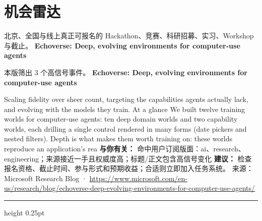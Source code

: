\documentclass[10.5pt]{ctexart}
\begin{document}
\section*{机会雷达}
{\color{ormuted} 北京、全国与线上真正可报名的 Hackathon、竞赛、科研招募、实习、Workshop 与截止。}
\vspace{2mm}
{\LARGE\bfseries Echoverse: Deep, evolving environments for computer-use agents}\par
\vspace{1mm}
{\color{ormuted} 本版筛出 3 个高信号事件。}
\vspace{3mm}
{\Large\bfseries Echoverse: Deep, evolving environments for computer-use agents}\par
Scaling fidelity over sheer count, targeting the capabilities agents actually lack, and evolving with the models they train. At a glance We built twelve training worlds for computer-use agents: ten deep domain worlds and two capability worlds, each drilling a single control rendered in many forms (date pickers and nested filters). Depth is what makes them worth training on: these worlds reproduce an application’s rea
\textbf{与你有关：} 命中用户订阅版面：ai、research、engineering；来源接近一手且权威度高；标题/正文包含高信号变化
\textbf{建议：} 检查报名资格、截止时间、参与形式和预期收益；合适则立即加入任务系统。
{\footnotesize\color{ormuted} 来源：Microsoft Research Blog · \url{https://www.microsoft.com/en-us/research/blog/echoverse-deep-evolving-environments-for-computer-use-agents/}}
\vspace{4mm}
\hrule height 0.25pt
\vspace{3mm}
\end{document}
